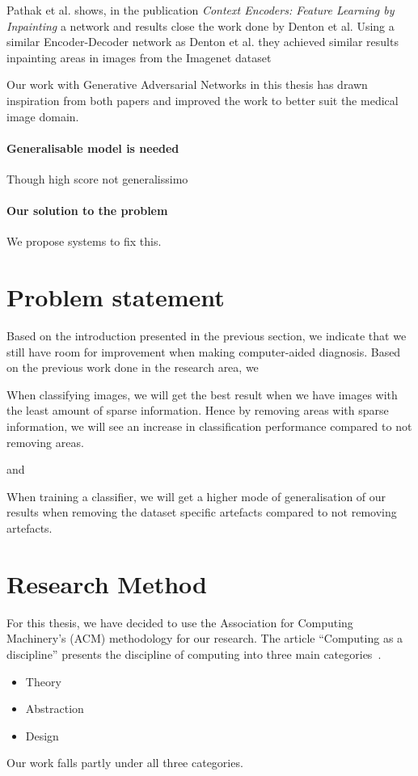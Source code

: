 Pathak et al. shows, in the publication \textit{Context Encoders: Feature Learning by Inpainting} a network and results close the work done by Denton et al. Using a similar Encoder-Decoder network as Denton et al. they achieved similar results inpainting areas in images from the Imagenet dataset

Our work with Generative Adversarial Networks in this thesis has drawn inspiration from both papers and improved the work to better suit the medical image domain.
\fi


\paragraph{Generalisable model is needed}
Though high score not generalissimo

\paragraph{Our solution to the problem}
We propose systems to fix this. 
    
    
\section{Problem statement}
Based on the introduction presented in the previous section, we indicate that we still have room for improvement when making computer-aided diagnosis. 
Based on the previous work done in the research area, we 


\noindent
\begin{hyp} \label{hyp:a}
When classifying images, we will get the best result when we have images with the least amount of sparse information. 
Hence by removing areas with sparse information,
we will see an increase in classification performance compared to not removing areas.
\end{hyp}

\noindent
and

\noindent 
\begin{hyp} \label{hyp:b}
When training a classifier, we will get a higher
mode of generalisation of our results when removing the dataset
specific artefacts compared to not removing artefacts.
\end{hyp}
\vspace{5px}


\section{Research Method}
For this thesis, we have decided to use the Association for Computing Machinery's (ACM) methodology for our research. The article ``Computing as a discipline'' presents the discipline of computing into three main categories~\cite{Denning:1989:CD:63238.63239}. 
\begin{itemize}
\item Theory
\item Abstraction
\item Design
\end{itemize}
Our work falls partly under all three categories.

